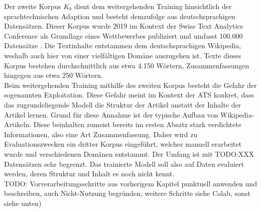 Der zweite Korpus $K_b$ dient dem weitergehenden Training hinsichtlich der sprachtechnischen Adaption und besteht demzufolge aus deutschsprachigen Datensätzen. Dieser Korpus wurde 2019 im Kontext der Swiss Text Analytics Conference als Grundlage eines Wettbewerbes publiziert und umfasst 100.000 Datensätze \cite{CIE19}. Die Textinhalte entstammen dem deutschsprachigen Wikipedia, weshalb auch hier von einer vielfältigen Domäne auszugehen ist. Texte dieses Korpus bestehen durchschnittlich aus etwa 4.150 Wörtern, Zusammenfassungen hingegen aus etwa 250 Wörtern.\\

Beim weitergehenden Training mithilfe des zweiten Korpus besteht die Gefahr der sogenannten Exploitation. Diese Gefahr meint im Kontext der \ac{ATS} konkret, dass das zugrundeliegende Modell die Struktur der Artikel anstatt der Inhalte der Artikel lernen. Grund für diese Annahme ist der typische Aufbau von Wikipedia-Artikeln. Diese beinhalten zumeist bereits im ersten Absatz stark verdichtete Informationen, also eine Art Zusammenfassung. Daher wird zu Evaluationszwecken ein dritter Korpus eingeführt, welcher manuell erarbeitet wurde und verschiedenen Domänen entstammt. Der Umfang ist mit TODO:XXX Datensätzen sehr begrenzt. Das trainierte Modell soll also auf Daten evaluiert werden, deren Struktur und Inhalt es noch nicht kennt.\\


\noindent
TODO: Vorverarbeitungsschritte aus vorherigem Kapitel punktuell anwenden und beschreiben, auch Nicht-Nutzung begründen, weitere Schritte siehe Colab, sonst siehe unten)


